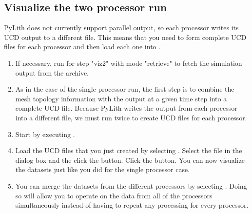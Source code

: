\subsection{Visualize the two processor run}

PyLith does not currently support parallel output, so each processor
writes its UCD output to a different file. This means that you need to
form complete UCD files for each processor and then load each one into
.

\begin{enumerate}
\item If necessary, run  for step "viz2" with mode
  "retrieve" to fetch the simulation output from the archive.

  \begin{screen}
    \shellprompt{}
  \end{screen}
  
\item As in the case of the single processor run, the first step is to
  combine the mesh topology information with the output at a given
  time step into a complete UCD file. Because PyLith writes the output
  from each processor into a different file, we must run 
  twice to create UCD files for each processor.

  \begin{screen}
    \shellprompt{}
    \shellprompt{}
  \end{screen}

\item Start  by executing .

  \begin{screen}
    \shellprompt{}
  \end{screen}
  
\item Load the UCD files that you just created by selecting
  \guiselect{}. Select the file in
  the dialog box and the click the  button. Click the
   button. You can now visualize the datasets just
  like you did for the single processor case.
\item You can merge the datasets from the different processors by
  selecting \guiselect{}. Doing so
  will allow you to operate on the data from all of the processors
  simultaneously instead of having to repeat any processing for every
  processor.
\end{enumerate}
